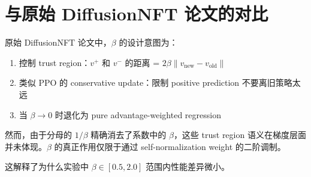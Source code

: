 \documentclass[11pt,a4paper]{article}
\theoremstyle{definition}
\begin{document}
\section{与原始 DiffusionNFT 论文的对比}
\label{sec:original}

原始 DiffusionNFT 论文中，$\beta$ 的设计意图为：
\begin{enumerate}
\item 控制 trust region：$v^+$ 和 $v^-$ 的距离 = $2\beta\|v_{\text{new}} - v_{\text{old}}\|$
\item 类似 PPO 的 conservative update：限制 positive prediction 不要离旧策略太远
\item 当 $\beta \to 0$ 时退化为 pure advantage-weighted regression
\end{enumerate}

然而，由于分母的 $1/\beta$ 精确消去了系数中的 $\beta$，这些 trust region 语义在梯度层面并未体现。$\beta$ 的真正作用仅限于通过 self-normalization weight 的二阶调制。

这解释了为什么实验中 $\beta \in [0.5, 2.0]$ 范围内性能差异微小。
\end{document}
